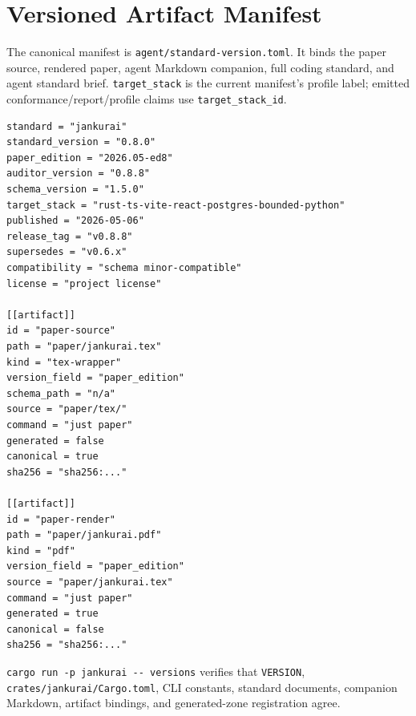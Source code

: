 \section{Versioned Artifact Manifest}

The canonical manifest is \texttt{agent/standard-version.toml}. It binds the paper source, rendered paper, agent Markdown companion, full coding standard, and agent standard brief. \texttt{target\_stack} is the current manifest's profile label; emitted conformance/report/profile claims use \texttt{target\_stack\_id}.

\begin{lstlisting}[style=codebox]
standard = "jankurai"
standard_version = "0.8.0"
paper_edition = "2026.05-ed8"
auditor_version = "0.8.8"
schema_version = "1.5.0"
target_stack = "rust-ts-vite-react-postgres-bounded-python"
published = "2026-05-06"
release_tag = "v0.8.8"
supersedes = "v0.6.x"
compatibility = "schema minor-compatible"
license = "project license"

[[artifact]]
id = "paper-source"
path = "paper/jankurai.tex"
kind = "tex-wrapper"
version_field = "paper_edition"
schema_path = "n/a"
source = "paper/tex/"
command = "just paper"
generated = false
canonical = true
sha256 = "sha256:..."

[[artifact]]
id = "paper-render"
path = "paper/jankurai.pdf"
kind = "pdf"
version_field = "paper_edition"
source = "paper/jankurai.tex"
command = "just paper"
generated = true
canonical = false
sha256 = "sha256:..."
\end{lstlisting}

\verb|cargo run -p jankurai -- versions| verifies that \texttt{VERSION}, \texttt{crates/jankurai/Cargo.toml}, CLI constants, standard documents, companion Markdown, artifact bindings, and generated-zone registration agree.
